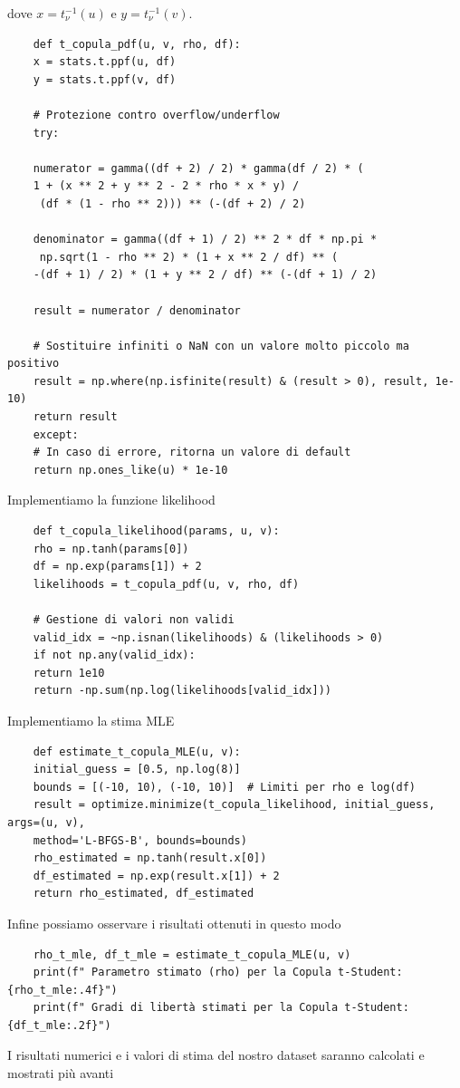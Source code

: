 \documentclass[%
	corpo=11pt,
    twoside,
    stile=classica,
    oldstyle,
    tipotesi=custom,
    greek,
    evenboxes,
]{toptesi}
\begin{document}
dove \( x = t_{\nu}^{-1}(u) \) e \( y = t_{\nu}^{-1}(v) \).
\begin{Verbatim}
	def t_copula_pdf(u, v, rho, df):
	x = stats.t.ppf(u, df)
	y = stats.t.ppf(v, df)
	
	# Protezione contro overflow/underflow
	try:
	
	numerator = gamma((df + 2) / 2) * gamma(df / 2) * (
	1 + (x ** 2 + y ** 2 - 2 * rho * x * y) /
	 (df * (1 - rho ** 2))) ** (-(df + 2) / 2)
	 
	denominator = gamma((df + 1) / 2) ** 2 * df * np.pi *
	 np.sqrt(1 - rho ** 2) * (1 + x ** 2 / df) ** (
	-(df + 1) / 2) * (1 + y ** 2 / df) ** (-(df + 1) / 2)
	
	result = numerator / denominator
	
	# Sostituire infiniti o NaN con un valore molto piccolo ma positivo
	result = np.where(np.isfinite(result) & (result > 0), result, 1e-10)
	return result
	except:
	# In caso di errore, ritorna un valore di default
	return np.ones_like(u) * 1e-10
\end{Verbatim}
Implementiamo la funzione likelihood
\begin{verbatim}
	def t_copula_likelihood(params, u, v):
	rho = np.tanh(params[0])
	df = np.exp(params[1]) + 2
	likelihoods = t_copula_pdf(u, v, rho, df)
	
	# Gestione di valori non validi
	valid_idx = ~np.isnan(likelihoods) & (likelihoods > 0)
	if not np.any(valid_idx):
	return 1e10
	return -np.sum(np.log(likelihoods[valid_idx]))
\end{verbatim}
Implementiamo la stima MLE
\begin{verbatim}
	def estimate_t_copula_MLE(u, v):
	initial_guess = [0.5, np.log(8)]
	bounds = [(-10, 10), (-10, 10)]  # Limiti per rho e log(df)
	result = optimize.minimize(t_copula_likelihood, initial_guess, args=(u, v),
	method='L-BFGS-B', bounds=bounds)
	rho_estimated = np.tanh(result.x[0])
	df_estimated = np.exp(result.x[1]) + 2
	return rho_estimated, df_estimated
\end{verbatim}
Infine possiamo osservare i risultati ottenuti in questo modo
\begin{verbatim}
	rho_t_mle, df_t_mle = estimate_t_copula_MLE(u, v)
	print(f" Parametro stimato (rho) per la Copula t-Student: {rho_t_mle:.4f}")
	print(f" Gradi di libertà stimati per la Copula t-Student: {df_t_mle:.2f}")
\end{verbatim}
I risultati numerici e i valori di stima del nostro dataset saranno calcolati e mostrati più avanti
\end{document}
